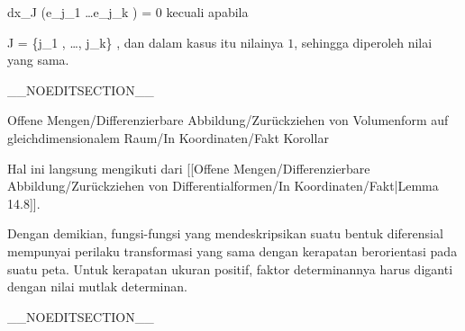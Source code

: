 {\mavergleichskette
{\vergleichskette
{ dx_J (e_{j_1 } \wedge \ldots \wedge e_{j_k })
}
{ = }{ 0
}
{  }{
}
{    }{
}
{   }{
}
}
{}{}{}
kecuali apabila

\mavergleichskette
{\vergleichskette
{ J
}
{ = }{ \{j_1 , \ldots , j_k\}
}
{  }{
}
{    }{
}
{   }{
}
}
{}{}{,}
dan dalam kasus itu nilainya $1$, sehingga diperoleh nilai yang sama.

}

__NOEDITSECTION__

{Offene Mengen/Differenzierbare Abbildung/Zurückziehen von Volumenform auf gleichdimensionalem Raum/In Koordinaten/Fakt}
{Korollar}
{}
{

\faktzusatz {}
\faktzusatz {}

}
{

Hal ini langsung mengikuti dari
[[Offene Mengen/Differenzierbare Abbildung/Zurückziehen von Differentialformen/In Koordinaten/Fakt|Lemma 14.8]].

}
Dengan demikian, fungsi-fungsi yang mendeskripsikan suatu bentuk diferensial mempunyai perilaku transformasi yang sama dengan kerapatan berorientasi pada suatu peta. Untuk kerapatan ukuran positif, faktor determinannya harus diganti dengan nilai mutlak determinan.

__NOEDITSECTION__

